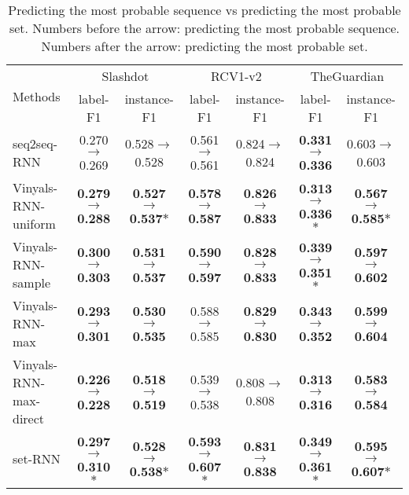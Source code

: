\begin{table*}[ht]
  \begin{center}
    \begin{tabular}{|l|cc|cc|cc|}
      \hline
      \multirow{2}{*}{Methods}  &  
             \multicolumn{2}{c|}{Slashdot}&\multicolumn{2}{c|}{RCV1-v2}&\multicolumn{2}{c|}{TheGuardian} \\
             \cline{2-7}
           & label-F1 & instance-F1  & label-F1 & instance-F1 & label-F1 & instance-F1\\

                        \hline



            seq2seq-RNN  
             & 0.270$\to$0.269 & 0.528$\to$0.528& 0.561$\to$0.561 & 0.824$\to$0.824 &\textbf{0.331}$\to$\textbf{0.336}& 0.603$\to$0.603\\
            Vinyals-RNN-uniform  
             & \textbf{0.279}$\to$\textbf{0.288}& \textbf{0.527}$\to$\textbf{0.537$\ast$}& \textbf{0.578}$\to$\textbf{0.587}& \textbf{0.826}$\to$\textbf{0.833}& \textbf{0.313}$\to$\textbf{0.336$\ast$}& \textbf{0.567}$\to$\textbf{0.585$\ast$}\\
             Vinyals-RNN-sample
            & \textbf{0.300}$\to$\textbf{0.303} & \textbf{0.531}$\to$\textbf{0.537} & \textbf{0.590}$\to$\textbf{0.597} & \textbf{0.828}$\to$\textbf{0.833} & \textbf{0.339}$\to$\textbf{0.351$\ast$} & \textbf{0.597}$\to$\textbf{0.602} \\
            Vinyals-RNN-max
            & \textbf{0.293}$\to$\textbf{0.301} & \textbf{0.530}$\to$\textbf{0.535} & 0.588$\to$0.585 & \textbf{0.829}$\to$\textbf{0.830} & \textbf{0.343}$\to$\textbf{0.352} & \textbf{0.599}$\to$\textbf{0.604} \\
            Vinyals-RNN-max-direct
             & \textbf{0.226}$\to$\textbf{0.228}& \textbf{0.518}$\to$\textbf{0.519}& 0.539$\to$0.538& 0.808$\to$0.808& \textbf{0.313}$\to$\textbf{0.316}& \textbf{0.583}$\to$\textbf{0.584}\\
            
            set-RNN 
             & \textbf{0.297}$\to$\textbf{0.310$\ast$} & \textbf{0.528}$\to$\textbf{0.538$\ast$} & \textbf{0.593}$\to$\textbf{0.607$\ast$} & \textbf{0.831}$\to$\textbf{0.838} &\textbf{0.349}$\to$\textbf{0.361$\ast$} & \textbf{0.595}$\to$\textbf{0.607$\ast$}\\\hline

    \end{tabular}
  \end{center}
  \caption{Predicting the most probable sequence vs predicting the most probable set. Numbers before the arrow: predicting the most probable sequence. Numbers after the arrow: predicting the most probable set. 
    }\label{table_prediction}
\end{table*}
